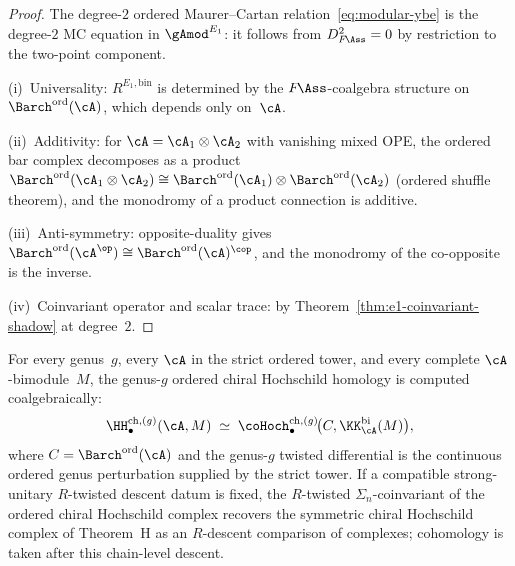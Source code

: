 \begin{proof}
The degree-$2$ ordered Maurer--Cartan relation~\eqref{eq:modular-ybe} is the
degree-$2$ MC equation in ${\gAmod}^{E_1}$: it follows from
$D_{F\!\Ass}^2 = 0$ by restriction to the two-point
component.

(i)~Universality: $R^{E_1,\mathrm{bin}}$ is determined by the
$F\!\Ass$-coalgebra structure on ${\Barch}^{\mathrm{ord}}(\cA)$,
which depends only on~$\cA$.

(ii)~Additivity: for $\cA = \cA_1 \otimes \cA_2$ with vanishing
mixed OPE, the ordered bar complex decomposes as a product
${\Barch}^{\mathrm{ord}}(\cA_1 \otimes \cA_2) \cong
{\Barch}^{\mathrm{ord}}(\cA_1) \otimes
{\Barch}^{\mathrm{ord}}(\cA_2)$
(ordered shuffle theorem), and the monodromy of a product
connection is additive.

(iii)~Anti-symmetry: opposite-duality gives
${\Barch}^{\mathrm{ord}}(\cA^{\op}) \cong
{\Barch}^{\mathrm{ord}}(\cA)^{\cop}$,
and the monodromy of the co-opposite is the inverse.

(iv)~Coinvariant operator and scalar trace: by
Theorem~\ref{thm:e1-coinvariant-shadow} at degree~$2$.
\end{proof}

\begin{theorem}
\label{thm:e1-theorem-H-modular}
For every genus~$g$, every $\cA$ in the strict ordered tower, and
every complete $\cA$-bimodule~$M$, the
genus-$g$ ordered chiral Hochschild homology is computed
coalgebraically\textup{:}
\[
\HH^{\mathrm{ch},(g)}_\bullet(\cA, M)
\;\simeq\;
\coHoch^{\mathrm{ch},(g)}_\bullet\!\bigl(
C, \KK_\cA^{\mathrm{bi}}(M)
\bigr),
\]
where $C = {\Barch}^{\mathrm{ord}}(\cA)$ and the genus-$g$ twisted
differential is the continuous ordered genus perturbation supplied by
the strict tower. If a compatible strong-unitary $R$-twisted descent
datum is fixed, the $R$-twisted $\Sigma_n$-coinvariant of the ordered
chiral Hochschild complex recovers the symmetric chiral Hochschild
complex of Theorem~H as an $R$-descent comparison of complexes;
cohomology is taken after this chain-level descent.
\end{theorem}

